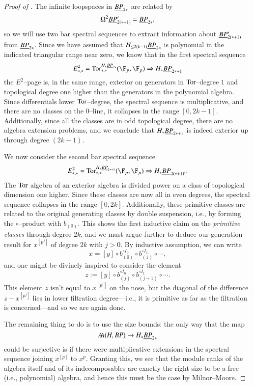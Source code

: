 \begin{proof}[{Proof of }]
The infinite loopspaces in $\underline{\smash{BP}}_{2*}$ are related by \[\Omega^2 \underline{\smash{BP}}_{2(*+1)}' = \underline{\smash{BP}}_{2*},\] so we will use two bar spectral sequences to extract information about $\underline{\smash{BP}}_{2(*+1)}'$ from $\underline{\smash{BP}}_{2*}$.  Since we have assumed that $H_{\le 2(k-1)} \underline{\smash{BP}}_{2*}$ is polynomial in the indicated triangular range near zero, we know that in the first spectral sequence \[E^2_{*, *} = \Tor^{H_* \OS{BP}{2*}}_{*, *}(\F_p, \F_p) \Rightarrow H_* \OS{BP}{2*+1}\] the $E^2$--page is, in the same range, exterior on generators in $\operatorname{Tor}$--degree $1$ and topological degree one higher than the generators in the polynomial algebra.  Since differentials lower $\operatorname{Tor}$--degree, the spectral sequence is multiplicative, and there are no classes on the $0$--line, it collapses in the range $[0, 2k-1]$.  Additionally, since all the classes are in odd topological degree, there are no algebra extension problems, and we conclude that $H_* \underline{\smash{BP}}_{2*+1}$ is indeed exterior up through degree $(2k-1)$.

We now consider the second bar spectral sequence \[E^2_{*, *} = \Tor^{H_* \OS{BP}{2*+1}}_{*, *}(\F_p, \F_p) \Rightarrow H_* \OS{BP}{2(*+1)'}.\]  The $\operatorname{Tor}$ algebra of an exterior algebra is divided power on a class of topological dimension one higher.  Since these classes are now all in even degrees, the spectral sequence collapses in the range $[0, 2k]$.  Additionally, these primitive classes are related to the original generating classes by double suspension, i.e., by forming the $\circ$--product with $b_{(0)}$.  This shows the first inductive claim on the \emph{primitive classes} through degree $2k$, and we must argue further to deduce our generation result for $x^{[p^j]}$ of degree $2k$ with $j > 0$.  By inductive assumption, we can write \[x = [y] \circ b_{(0)}^{\circ I_0} \circ b_{(1)}^{\circ I_1} \circ \cdots,\] and one might be divinely inspired to consider the element \[z := [y] \circ b_{(j)}^{\circ I_0} \circ b_{(j+1)}^{\circ I_1} \circ \cdots.\]  This element $z$ isn't equal to $x^{[p^j]}$ on the nose, but the diagonal of the difference $z - x^{[p^j]}$ lies in lower filtration degree---i.e., it is primitive as far as the filtration is concerned---and so we are again done.

The remaining thing to do is to use the size bounds: the only way that the map \[A\!\!A(H, BP) \to H_* \underline{\smash{BP}}_{2*}\] could be surjective is if there were multiplicative extensions in the spectral sequence joining $x^{[p]}$ to $x^p$.  Granting this, we see that the module ranks of the algebra itself and of its indecomposables are exactly the right size to be a free (i.e., polynomial) algebra, and hence this must be the case by Milnor--Moore.
\end{proof}

